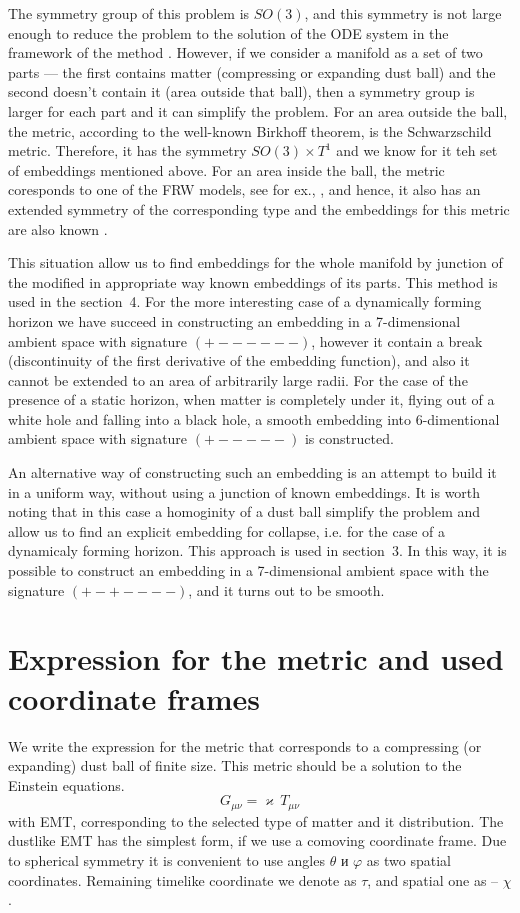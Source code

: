 \documentclass[12pt]{article}
\begin{document}
The symmetry group of this problem is $SO(3)$, and this symmetry is not large enough to reduce the problem to the solution of the ODE system in the framework of the method \cite{statja27}. However, if we consider a manifold as a set of two parts ---
the first contains matter (compressing or expanding dust ball) and the second doesn't contain it (area outside that ball), then a symmetry group is larger for each part and it can simplify the problem. For an area outside the ball, the metric, according to the well-known Birkhoff theorem, is the Schwarzschild metric. Therefore, it has the symmetry $SO(3) \times T^1$ and we know for it teh set of embeddings mentioned above. For an area inside the ball, the metric coresponds to one of the FRW models, see for ex., \cite{landavshic2},
and hence, it also has an extended symmetry of the corresponding type and the embeddings for this metric are also known \cite{robertson1933}.

This situation allow us to find embeddings for the whole manifold by junction of the modified in appropriate way
known embeddings of its parts. This method is used in the section~4. For the more interesting case of a dynamically forming horizon we have succeed in constructing an embedding in a 7-dimensional ambient space with signature $(+------)$, however it contain a break (discontinuity of the first derivative of the embedding function), and also it cannot be extended to an area of arbitrarily large radii. For the case of the presence of a static horizon, when matter is completely under it, flying out of a white hole and falling into a black hole, a smooth embedding into 6-dimentional ambient space with signature $(+-----)$ is constructed.

An alternative way of constructing such an embedding is an attempt to build it in a uniform way, without using a junction of known embeddings. It is worth noting that in this case a homoginity of a dust ball simplify the problem and allow us to find an explicit embedding for collapse, i.e. for the case of a dynamicaly forming horizon.
This approach is used in section~3.
In this way, it is possible to construct an embedding in a 7-dimensional ambient space with the signature $(+-+----)$, and it turns out to be smooth.




\section{Expression for the metric and used coordinate frames}
We write the expression for the metric that corresponds to a compressing (or expanding) dust ball of finite size. This metric should be a solution to the Einstein equations.
\begin{equation}
\label{G=T}
	G_{\mu \nu} = \varkappa\, T_{\mu \nu}
\end{equation}
with EMT, corresponding to the selected type of matter and it distribution.
The dustlike EMT has the simplest form, if we use a comoving coordinate frame.
Due to spherical symmetry it is convenient to use angles $\theta$ и $\varphi$ as two spatial coordinates.
Remaining timelike coordinate we denote as $\tau$, and spatial one as -- $\chi$.
\end{document}

